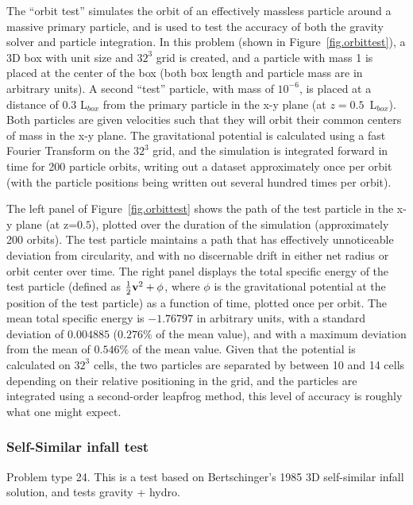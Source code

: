 The ``orbit test'' simulates the orbit of an effectively massless
particle around a massive primary particle, and is used to test the
accuracy of both the gravity solver and particle integration.  In this
problem (shown in Figure~\ref{fig.orbittest}), a 3D box with unit size
and $32^3$ grid is created, and a particle with mass 1 is placed at
the center of the box (both box length and particle mass are in
arbitrary units).  A second ``test'' particle, with mass of $10^{-6}$,
is placed at a distance of 0.3 L$_{box}$ from the primary particle in
the x-y plane (at $z=0.5$~L$_{box}$).  Both particles are given
velocities such that they will orbit their common centers of mass in
the x-y plane.  The gravitational potential is calculated using a fast
Fourier Transform on the $32^3$ grid, and the simulation is integrated
forward in time for 200 particle orbits, writing out a dataset
approximately once per orbit (with the particle positions being
written out several hundred times per orbit).

The left panel of Figure~\ref{fig.orbittest} shows the path of the
test particle in the x-y plane (at z=$0.5$), plotted over the duration
of the simulation (approximately 200 orbits).  The test particle
maintains a path that has effectively unnoticeable deviation from
circularity, and with no discernable drift in either net radius or
orbit center over time.  The right panel displays the total specific
energy of the test particle (defined as $\frac{1}{2} {\bf v}^2 +
\phi$, where $\phi$ is the gravitational potential at the position of
the test particle) as a function of time, plotted once per orbit.  The
mean total specific energy is $-1.76797$ in arbitrary units, with a
standard deviation of $0.004885$ ($0.276\%$ of the mean value), and
with a maximum deviation from the mean of $0.546\%$ of the mean value.
Given that the potential is calculated on $32^3$ cells, the two
particles are separated by between 10 and 14 cells depending on their
relative positioning in the grid, and the particles are integrated
using a second-order leapfrog method, this level of accuracy is
roughly what one might expect.

\subsubsection{Self-Similar infall test}
\label{sec.tests.infall}
Problem type 24.  This is a test based on Bertschinger's 1985 3D self-similar infall
solution, and tests gravity + hydro.

